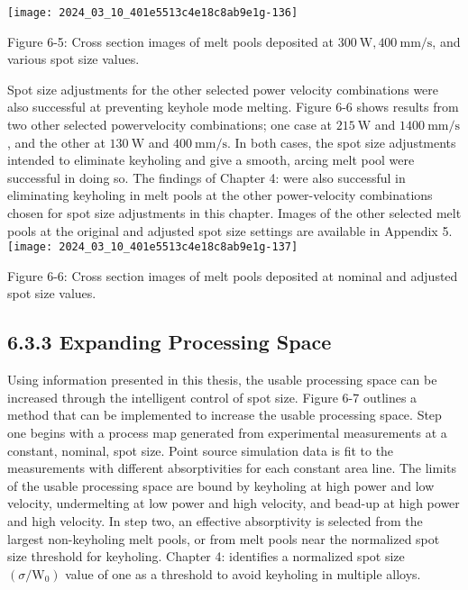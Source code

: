 \documentclass[10pt]{article}
\begin{document}
\begin{center}
\texttt{[image: 2024\_03\_10\_401e5513c4e18c8ab9e1g-136]}
\end{center}

Figure 6-5: Cross section images of melt pools deposited at $300 \mathrm{~W}, 400 \mathrm{~mm} / \mathrm{s}$, and various spot size values.

Spot size adjustments for the other selected power velocity combinations were also successful at preventing keyhole mode melting. Figure 6-6 shows results from two other selected powervelocity combinations; one case at $215 \mathrm{~W}$ and $1400 \mathrm{~mm} / \mathrm{s}$, and the other at $130 \mathrm{~W}$ and $400 \mathrm{~mm} / \mathrm{s}$. In both cases, the spot size adjustments intended to eliminate keyholing and give a smooth, arcing melt pool were successful in doing so. The findings of Chapter 4: were also successful in eliminating keyholing in melt pools at the other power-velocity combinations chosen for spot size adjustments in this chapter. Images of the other selected melt pools at the original and adjusted spot size settings are available in Appendix 5.\\
\texttt{[image: 2024\_03\_10\_401e5513c4e18c8ab9e1g-137]}

Figure 6-6: Cross section images of melt pools deposited at nominal and adjusted spot size values.

\subsection*{6.3.3 Expanding Processing Space}
Using information presented in this thesis, the usable processing space can be increased through the intelligent control of spot size. Figure 6-7 outlines a method that can be implemented to increase the usable processing space. Step one begins with a process map generated from experimental measurements at a constant, nominal, spot size. Point source simulation data is fit to the measurements with different absorptivities for each constant area line. The limits of the usable processing space are bound by keyholing at high power and low velocity, undermelting at low power and high velocity, and bead-up at high power and high velocity. In step two, an effective absorptivity is selected from the largest non-keyholing melt pools, or from melt pools near the normalized spot size threshold for keyholing. Chapter 4: identifies a normalized spot size $\left(\sigma / \mathrm{W}_{0}\right)$ value of one as a threshold to avoid keyholing in multiple alloys.
\end{document}
